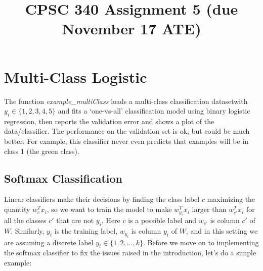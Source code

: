 \documentclass{article}
\begin{document}
\title{CPSC 340 Assignment 5 (due November 17 ATE)}
\author{}
\date{}
\maketitle
\vspace{-4em}


\section{Multi-Class Logistic}

The function \emph{example\_multiClass} loads a multi-class classification datasetwith $y_i \in \{1,2,3,4,5\}$ and fits a `one-vs-all' classification model using binary logistic regression, then reports the validation error and shows a plot of the data/classifier. The performance on the validation set is ok, but could be much better. For example, this classifier never even predicts that examples will be in class 1 (the green class).

\subsection{Softmax Classification}

Linear classifiers make their decisions by finding the class label $c$ maximizing the quantity $w_c^Tx_i$, so we want to train the model to make $w_{y_i}^Tx_i$ larger than $w_{c'}^Tx_i$ for all the classes $c'$ that are not $y_i$. 
Here $c$ is a possible label and $w_{c'}$ is column $c'$ of $W$. Similarly, $y_i$ is the training label, $w_{y_i}$ is column $y_i$ of $W$, and in this setting we are assuming a discrete label $y_i \in \{1,2,\dots,k\}$. Before we move on to implementing the softmax classifier to fix the issues raised in the introduction, let's do a simple example:
\end{document}
